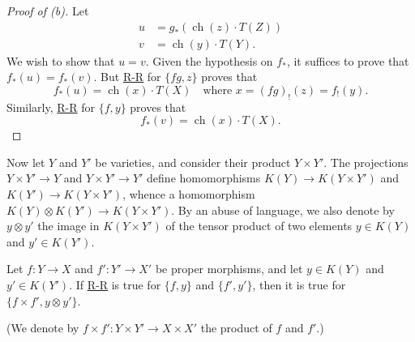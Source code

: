 \documentclass{article}
\theoremstyle{plain}
\newenvironment{lemma}[1]
    {\renewcommand\theinnerlemma{#1}\innerlemma}
    {\endinnerlemma}
\theoremstyle{definition}
\DeclareMathOperator{\ch}{ch}
\begin{document}
\begin{proof}[Proof of (b)]
  Let
  \begin{align*}
    u &= g_*(\ch(z)\cdot T(Z))
  \\v &= \ch(y)\cdot T(Y).
  \end{align*}
  We wish to show that $u=v$.
  Given the hypothesis on $f_*$, it suffices to prove that $f_*(u)=f_*(v)$.
  But \hyperref[theoremriemannroch]{R-R} for $\{fg,z\}$ proves that
  \[
    f_*(u) = \ch(x)\cdot T(X)
    \quad
    \mbox{where $x=(fg)_!(z)=f_!(y)$.}
  \]
  Similarly, \hyperref[theoremriemannroch]{R-R} for $\{f,y\}$ proves that
  \[
    f_*(v) = \ch(x)\cdot T(X).
  \]
\end{proof}

Now let $Y$ and $Y'$ be varieties, and consider their product $Y\times Y'$.
The projections $Y\times Y'\to Y$ and $Y\times Y'\to Y'$ define homomorphisms $K(Y)\to K(Y\times Y')$ and $K(Y')\to K(Y\times Y')$, whence a homomorphism $K(Y)\otimes K(Y')\to K(Y\times Y')$.
By an abuse of language, we also denote by $y\otimes y'$ the image in $K(Y\times Y')$ of the tensor product of two elements $y\in K(Y)$ and $y'\in K(Y')$.

\begin{lemma}{16}
\label{lemma16}
  Let $f\colon Y\to X$ and $f'\colon Y'\to X'$ be proper morphisms, and let $y\in K(Y)$ and $y'\in K(Y')$.
  If \hyperref[theoremriemannroch]{R-R} is true for $\{f,y\}$ and $\{f',y'\}$, then it is true for $\{f\times f',y\otimes y'\}$.
\end{lemma}

(We denote by $f\times f'\colon Y\times Y'\to X\times X'$ the product of $f$ and $f'$.)
\end{document}
